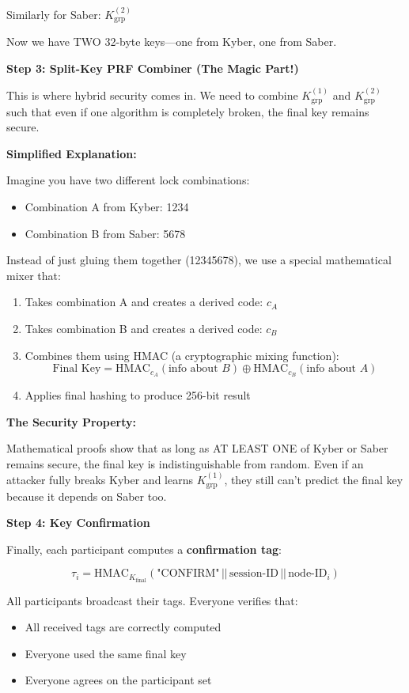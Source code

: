 \documentclass[12pt,a4paper]{report}
\begin{document}
Similarly for Saber: $K_{\text{grp}}^{(2)}$

Now we have TWO 32-byte keys—one from Kyber, one from Saber.

\textbf{Step 3: Split-Key PRF Combiner (The Magic Part!)}

This is where hybrid security comes in. We need to combine $K_{\text{grp}}^{(1)}$ and $K_{\text{grp}}^{(2)}$ such that even if one algorithm is completely broken, the final key remains secure.

\textbf{Simplified Explanation:}

Imagine you have two different lock combinations:
\begin{itemize}
\item Combination A from Kyber: 1234
\item Combination B from Saber: 5678
\end{itemize}

Instead of just gluing them together (12345678), we use a special mathematical mixer that:
\begin{enumerate}
\item Takes combination A and creates a derived code: $c_A$
\item Takes combination B and creates a derived code: $c_B$
\item Combines them using HMAC (a cryptographic mixing function):
\[
\text{Final Key} = \text{HMAC}_{c_A}(\text{info about } B) \oplus \text{HMAC}_{c_B}(\text{info about } A)
\]
\item Applies final hashing to produce 256-bit result
\end{enumerate}

\textbf{The Security Property:}

Mathematical proofs show that as long as AT LEAST ONE of Kyber or Saber remains secure, the final key is indistinguishable from random. Even if an attacker fully breaks Kyber and learns $K_{\text{grp}}^{(1)}$, they still can't predict the final key because it depends on Saber too.

\textbf{Step 4: Key Confirmation}

Finally, each participant computes a \textbf{confirmation tag}:

\[
\tau_i = \text{HMAC}_{K_{\text{final}}}(\text{"CONFIRM"} \,||\, \text{session-ID} \,||\, \text{node-ID}_i)
\]

All participants broadcast their tags. Everyone verifies that:
\begin{itemize}
\item All received tags are correctly computed
\item Everyone used the same final key
\item Everyone agrees on the participant set
\end{itemize}
\end{document}
